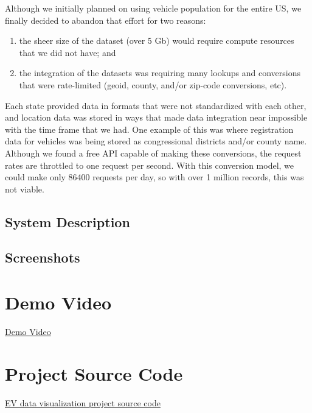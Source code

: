\documentclass{article}
\begin{document}
Although we initially planned on using vehicle population for the entire US, we
finally decided to abandon that effort for two reasons:
\begin{enumerate}
    \item the sheer size of the dataset (over 5 Gb) would require compute
    resources that we did not have; and
    \item the integration of the datasets was requiring many lookups and
    conversions that were rate-limited (geoid, county, and/or zip-code
    conversions, etc).
\end{enumerate}
Each state provided data in formats that were not standardized with each other,
and location data was stored in ways that made data integration near impossible with
the time frame that we had.  One example of this was where registration data for
vehicles was being stored as congressional districts and/or county name.
Although we found a free API capable of making these conversions, the request
rates are throttled to one request per second.  With this conversion model, we
could make only 86400 requests per day, so with over 1 million records, this
was not viable.

\subsection{System Description}



\subsection{Screenshots}



\section{Demo Video}
\href{
}{Demo Video}

\section{Project Source Code}
\href{https://github.com/mk-imagine/csc805g5}{EV data visualization project
source code}\\
\end{document}
